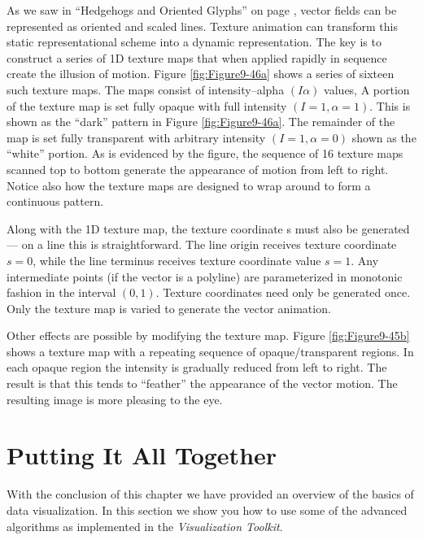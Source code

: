 As we saw in ``Hedgehogs and Oriented Glyphs'' on page \pageref{subsec:hedgehogs_oriented_glyphs}, vector fields can be represented as oriented and scaled lines. Texture animation can transform this static representational scheme into a dynamic representation. The key is to construct a series of 1D texture maps that when applied rapidly in sequence create the illusion of motion. Figure \ref{fig:Figure9-46a} shows a series of sixteen such texture maps. The maps consist of intensity--alpha $(I \alpha )$ values, A portion of the texture map is set fully opaque with full intensity $(I = 1, \alpha  = 1 )$. This is shown as the ``dark'' pattern in Figure \ref{fig:Figure9-46a}. The remainder of the map is set fully transparent with arbitrary intensity $( I = 1, \alpha = 0 )$ shown as the ``white'' portion. As is evidenced by the figure, the sequence of 16 texture maps scanned top to bottom generate the appearance of motion from left to right. Notice also how the texture maps are designed to wrap around to form a continuous pattern.

Along with the 1D texture map, the texture coordinate s must also be generated --- on a line this is straightforward. The line origin receives texture coordinate $s = 0$, while the line terminus receives texture coordinate value $s = 1$. Any intermediate points (if the vector is a polyline) are parameterized in monotonic fashion in the interval $(0,1)$. Texture coordinates need only be generated once. Only the texture map is varied to generate the vector animation.

Other effects are possible by modifying the texture map. Figure \ref{fig:Figure9-45b} shows a texture map with a repeating sequence of opaque/transparent regions. In each opaque region the intensity is gradually reduced from left to right. The result is that this tends to ``feather'' the appearance of the vector motion. The resulting image is more pleasing to the eye.

\section{Putting It All Together}

With the conclusion of this chapter we have provided an overview of the basics of data visualization. In this section we show you how to use some of the advanced algorithms as implemented in the \emph{Visualization Toolkit}.

